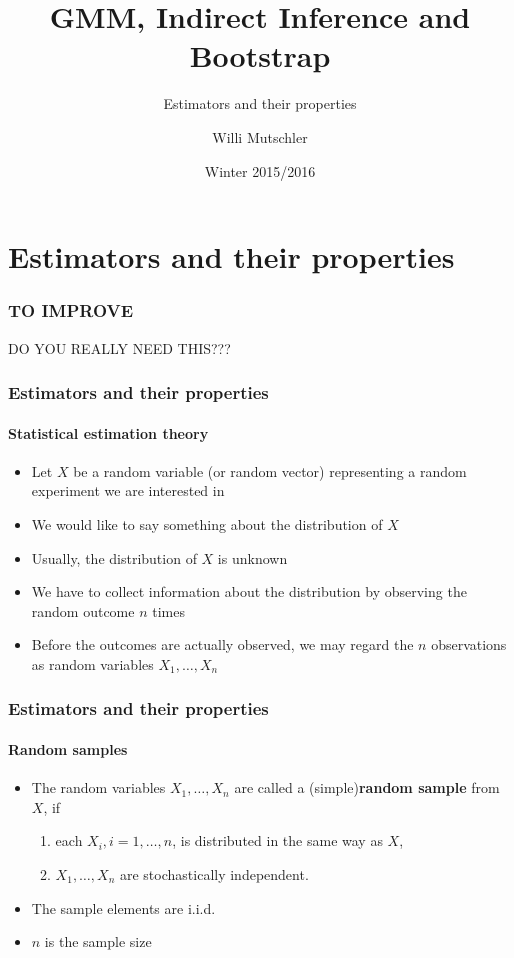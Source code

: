 \documentclass[notes=show]{beamer}
\begin{document}
\title{GMM, Indirect Inference and Bootstrap}
\subtitle{Estimators and their properties}
\author[Willi Mutschler]{Willi Mutschler}
\date{Winter 2015/2016}
\maketitle

\section{Estimators and their properties}
\begin{frame}\frametitle{TO IMPROVE}
  DO YOU REALLY NEED THIS???
\end{frame}
\begin{frame}\frametitle{Estimators and their properties}\framesubtitle{Statistical estimation theory}
\begin{itemize}
    \item Let $X$ be a random variable (or random vector) representing a random experiment we are interested in
    \item We would like to say something about the distribution of $X$
    \item Usually, the distribution of $X$ is unknown
    \item We have to collect information about the distribution by observing the random outcome $n$ times
    \item Before the outcomes are actually observed, we may regard the \newline $n$ observations as random variables $X_{1},\ldots ,X_{n}$
\end{itemize}
\end{frame}


\begin{frame}\frametitle{Estimators and their properties}\framesubtitle{Random samples}
\begin{itemize}
    \item The random variables $X_{1},\ldots ,X_{n}$ are called a (simple)\newline \textbf{random sample} from $X$, if
    \begin{enumerate}
        \item each $X_{i},i=1,\ldots ,n$, is distributed in the same way as $X$,
        \item $X_{1},\ldots ,X_{n}$ are stochastically independent.
    \end{enumerate}
    \item The sample elements are i.i.d.
    \item $n$ is the sample size
\end{itemize}
\end{frame}
\end{document}
